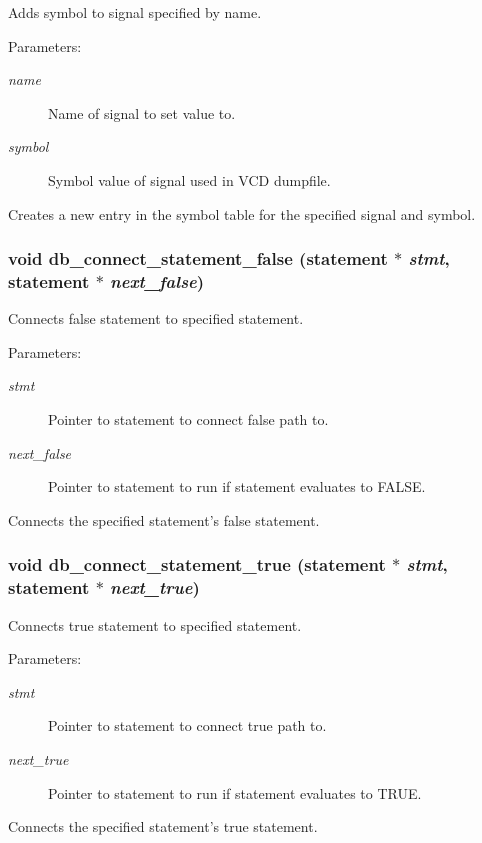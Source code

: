 Adds symbol to signal specified by name.

\begin{Desc}
\item[Parameters: ]\par
\begin{description}
\item[{\em 
name}]Name of signal to set value to. \item[{\em 
symbol}]Symbol value of signal used in VCD dumpfile.\end{description}
\end{Desc}
Creates a new entry in the symbol table for the specified signal and symbol. 
\subsubsection{\setlength{\rightskip}{0pt plus 5cm}void db\_\-connect\_\-statement\_\-false ({\bf statement} $\ast$ {\em stmt}, {\bf statement} $\ast$ {\em next\_\-false})}\label{db_8c_a24}


Connects false statement to specified statement.

\begin{Desc}
\item[Parameters: ]\par
\begin{description}
\item[{\em 
stmt}]Pointer to statement to connect false path to. \item[{\em 
next\_\-false}]Pointer to statement to run if statement evaluates to FALSE.\end{description}
\end{Desc}
Connects the specified statement's false statement. 
\subsubsection{\setlength{\rightskip}{0pt plus 5cm}void db\_\-connect\_\-statement\_\-true ({\bf statement} $\ast$ {\em stmt}, {\bf statement} $\ast$ {\em next\_\-true})}\label{db_8c_a23}


Connects true statement to specified statement.

\begin{Desc}
\item[Parameters: ]\par
\begin{description}
\item[{\em 
stmt}]Pointer to statement to connect true path to. \item[{\em 
next\_\-true}]Pointer to statement to run if statement evaluates to TRUE.\end{description}
\end{Desc}
Connects the specified statement's true statement. 
